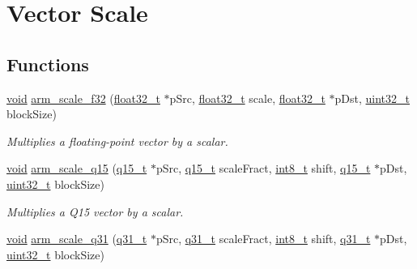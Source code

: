 \hypertarget{group__scale}{\section{Vector Scale}
\label{group__scale}
}
\subsection*{Functions}
\begin{DoxyCompactItemize}
\item 
\hyperlink{group___n_a_m_e_ga18028b8badbf1ea7e704ccac3c488e82}{void} \hyperlink{group__scale_ga3487af88b112f682ee90589cd419e123}{arm\-\_\-scale\-\_\-f32} (\hyperlink{arm__math_8h_a4611b605e45ab401f02cab15c5e38715}{float32\-\_\-t} $\ast$p\-Src, \hyperlink{arm__math_8h_a4611b605e45ab401f02cab15c5e38715}{float32\-\_\-t} scale, \hyperlink{arm__math_8h_a4611b605e45ab401f02cab15c5e38715}{float32\-\_\-t} $\ast$p\-Dst, \hyperlink{stdint_8h_a435d1572bf3f880d55459d9805097f62}{uint32\-\_\-t} block\-Size)
\begin{DoxyCompactList}\small\item\em Multiplies a floating-\/point vector by a scalar. \end{DoxyCompactList}\item 
\hyperlink{group___n_a_m_e_ga18028b8badbf1ea7e704ccac3c488e82}{void} \hyperlink{group__scale_gafaac0e1927daffeb68a42719b53ea780}{arm\-\_\-scale\-\_\-q15} (\hyperlink{arm__math_8h_ab5a8fb21a5b3b983d5f54f31614052ea}{q15\-\_\-t} $\ast$p\-Src, \hyperlink{arm__math_8h_ab5a8fb21a5b3b983d5f54f31614052ea}{q15\-\_\-t} scale\-Fract, \hyperlink{stdint_8h_ad566f6541e98b74246db1a3a3a85ad49}{int8\-\_\-t} shift, \hyperlink{arm__math_8h_ab5a8fb21a5b3b983d5f54f31614052ea}{q15\-\_\-t} $\ast$p\-Dst, \hyperlink{stdint_8h_a435d1572bf3f880d55459d9805097f62}{uint32\-\_\-t} block\-Size)
\begin{DoxyCompactList}\small\item\em Multiplies a Q15 vector by a scalar. \end{DoxyCompactList}\item 
\hyperlink{group___n_a_m_e_ga18028b8badbf1ea7e704ccac3c488e82}{void} \hyperlink{group__scale_ga83e36cd82bf51ce35406a199e477d47c}{arm\-\_\-scale\-\_\-q31} (\hyperlink{arm__math_8h_adc89a3547f5324b7b3b95adec3806bc0}{q31\-\_\-t} $\ast$p\-Src, \hyperlink{arm__math_8h_adc89a3547f5324b7b3b95adec3806bc0}{q31\-\_\-t} scale\-Fract, \hyperlink{stdint_8h_ad566f6541e98b74246db1a3a3a85ad49}{int8\-\_\-t} shift, \hyperlink{arm__math_8h_adc89a3547f5324b7b3b95adec3806bc0}{q31\-\_\-t} $\ast$p\-Dst, \hyperlink{stdint_8h_a435d1572bf3f880d55459d9805097f62}{uint32\-\_\-t} block\-Size)

\end{DoxyCompactItemize}
